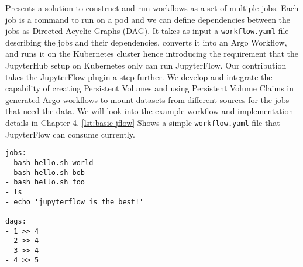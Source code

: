 \bigskip
\cite{jupyterflow} Presents a solution to construct and run workflows as a set of multiple jobs. Each job is a command to run on a pod and we can define dependencies between the jobs as Directed Acyclic Graphs (DAG). It takes as input a \lstinline{workflow.yaml} file describing the jobs and their dependencies, converts it into an Argo Workflow, and runs it on the Kubernetes cluster hence introducing the requirement that the JupyterHub setup on Kubernetes only can run JupyterFlow. Our contribution takes the JupyterFlow plugin a step further. We develop and integrate the capability of creating Persistent Volumes and using Persistent Volume Claims in generated Argo workflows to mount datasets from different sources for the jobs that need the data. We will look into the example workflow and implementation details in Chapter 4. \ref{lst:basic-jflow} Shows a simple \lstinline{workflow.yaml} file that JupyterFlow can consume currently.

\begin{lstlisting}[caption={Example JupyterFlow workflow.yaml file having 5 jobs, from JupyterFlow official examples},label={lst:basic-jflow}]
jobs:
- bash hello.sh world
- bash hello.sh bob
- bash hello.sh foo
- ls
- echo 'jupyterflow is the best!'

dags:
- 1 >> 4
- 2 >> 4
- 3 >> 4
- 4 >> 5
\end{lstlisting}
